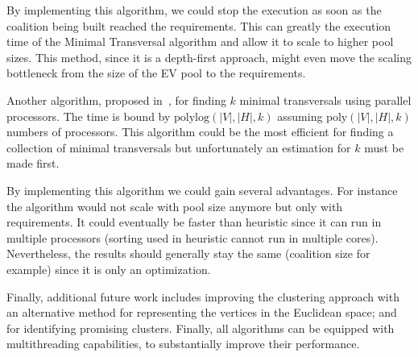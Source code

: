 By implementing this algorithm, we could stop the execution as soon as the coalition being built reached the requirements. This can greatly the execution time of the Minimal Transversal algorithm and allow it to scale to higher pool sizes. This method, since it is a depth-first approach, might even move the scaling bottleneck from the size of the EV pool to the requirements.

Another algorithm, proposed in~\cite{khachiyan2005new}, for finding $k$ minimal transversals using parallel processors. The time is bound by $\text{polylog}(|V|, |H|, k)$ assuming $\text{poly}(|V|, |H|, k)$ numbers of processors. This algorithm could be the most efficient for finding a collection of minimal transversals but unfortunately an estimation for $k$ must be made first.

By implementing this algorithm we could gain several advantages. For instance the algorithm would not scale with pool size anymore but only with requirements. It could eventually be faster than heuristic since it can run in multiple processors (sorting used in heuristic cannot run in multiple cores). Nevertheless, the results should generally stay the same (coalition size for example) since it is only an optimization.
 
Finally, additional future work includes improving the clustering approach with an alternative method for representing the vertices in the Euclidean space; and for identifying promising clusters.	Finally, all algorithms can be equipped with multithreading capabilities, to substantially improve their performance.

